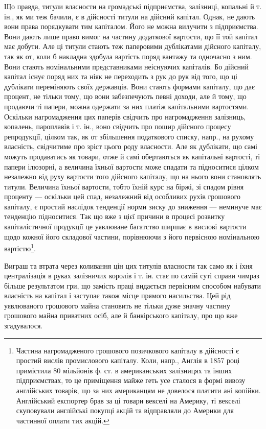 
Що правда, титули власности на громадські підприємства, залізниці,
копальні й т. ін., як ми теж бачили, є в дійсності титули на дійсний капітал.
Однак, не дають вони права порядкувати тим капіталом. Його не можна вилучити
з підприємства. Вони дають лише право вимог на частину додаткової вартости,
що її той капітал має добути. Але ці титули стають теж паперовими
дублікатами дійсного капіталу, так як от, коли б накладна здобула вартість
поряд вантажу та одночасно з ним. Вони стають номінальними представниками
неіснуючих капіталів. Бо дійсний капітал існує поряд них та ніяк не переходить
з рук до рук від того, що ці дублікати переміняють своїх державців. Вони стають
формами капіталу, що дає процент, не тільки тому, що вони забезпечують певні
доходи, але й тому, що продаючи ті папери, можна одержати за них платіж
капітальними вартостями. Оскільки нагромадження цих паперів свідчить про
нагромадження залізниць, копалень, пароплавів і т. ін., воно свідчить про пошир
дійсного процесу репродукції, цілком так, як от збільшення податкового списку,
напр., на рухому власність, свідчитиме про зріст цього роду власности. Але як
дублікати, що самі можуть продаватись як товари, отже й самі обертаються як
капітальні вартості, ті папери ілюзорні, а величина їхньої вартости може спадати
та підноситися цілком незалежно від руху вартости того дійсного капіталу, що
на нього вони становлять титули. Величина їхньої вартости, тобто їхній курс на
біржі, зі спадом рівня проценту — оскільки цей спад, незалежний від особливих
рухів грошового капіталу, є простий наслідок тенденції норми зиску до зниження
— неминуче має тенденцію підноситися. Так що вже з цієї причини
в процесі розвитку капіталістичної продукції це уявлюване багатство ширшає
в вислові вартости щодо кожної його складової частини, порівнюючи з його первісною
номінальною вартістю\footnote{
Частина нагромадженого грошового позичкового капіталу в дійсності є простий вислів промислового
капіталу. Коли, напр., Англія в 1857 році примістила 80 мільйонів ф. ст. в американських залізницях
та інших підприємствах, то це приміщення майже геть усе сталося в формі вивозу англійських товарів,
що за них американцям не довелося платити ані копійки. Англійський експортер брав за ці товари
векселі на Америку, ті векселі скуповували англійські покупці акцій та відправляли до Америки для
частинної оплати тих акцій.
}.

Виграш та втрата через коливання цін цих титулів власности так само як
і їхня централізація в руках залізничих королів і т. ін. стає по самій суті справи
чимраз більше результатом гри, що замість праці видається первісним способом
набувати власність на капітал і заступає також місце прямого насильства. Цей рід
уявлюваного грошового майна становить не тільки дуже значну частину грошового
майна приватних осіб, але й банкірського капіталу, про що вже згадувалося.

